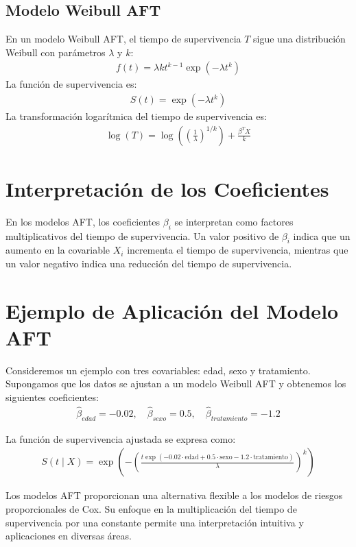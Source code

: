\documentclass[a4paper]{report} %
\begin{document}
\subsection*{Modelo Weibull AFT}
En un modelo Weibull AFT, el tiempo de supervivencia $T$ sigue una distribuci\'on Weibull con par\'ametros $\lambda$ y $k$:
\begin{eqnarray*}
f(t) = \lambda k t^{k-1} \exp(-\lambda t^k)
\end{eqnarray*}
La funci\'on de supervivencia es:
\begin{eqnarray*}
S(t) = \exp(-\lambda t^k)
\end{eqnarray*}
La transformaci\'on logar\'itmica del tiempo de supervivencia es:
\begin{eqnarray*}
\log(T) = \log\left(\left(\frac{1}{\lambda}\right)^{1/k}\right) + \frac{\beta^T X}{k}
\end{eqnarray*}

\section*{Interpretaci\'on de los Coeficientes}
En los modelos AFT, los coeficientes $\beta_i$ se interpretan como factores multiplicativos del tiempo de supervivencia. Un valor positivo de $\beta_i$ indica que un aumento en la covariable $X_i$ incrementa el tiempo de supervivencia, mientras que un valor negativo indica una reducci\'on del tiempo de supervivencia.

\section*{Ejemplo de Aplicaci\'on del Modelo AFT}
Consideremos un ejemplo con tres covariables: edad, sexo y tratamiento. Supongamos que los datos se ajustan a un modelo Weibull AFT y obtenemos los siguientes coeficientes:
\begin{eqnarray*}
\hat{\beta}_{edad} = -0.02, \quad \hat{\beta}_{sexo} = 0.5, \quad \hat{\beta}_{tratamiento} = -1.2
\end{eqnarray*}

La funci\'on de supervivencia ajustada se expresa como:
\begin{eqnarray*}
S(t \mid X) = \exp\left(-\left(\frac{t \exp(-0.02 \cdot \text{edad} + 0.5 \cdot \text{sexo} - 1.2 \cdot \text{tratamiento})}{\lambda}\right)^k\right)
\end{eqnarray*}

Los modelos AFT proporcionan una alternativa flexible a los modelos de riesgos proporcionales de Cox. Su enfoque en la multiplicaci\'on del tiempo de supervivencia por una constante permite una interpretaci\'on intuitiva y aplicaciones en diversas \'areas.
\end{document}
